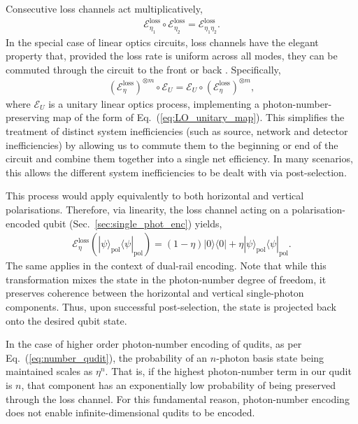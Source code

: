 \documentclass[aps, rmp, twocolumn, amsmath, amssymb, nofootinbib, superscriptaddress, longbibliography, floatfix, table-of-contents, eqsecnum]{revtex4-1}
\newcommand{\bra}[1]{\langle#1|}
\newcommand{\ket}[1]{|#1\rangle}
\begin{document}
Consecutive loss channels act multiplicatively,
\begin{align}
\mathcal{E}_{\eta_1}^\text{loss} \circ \mathcal{E}_{\eta_2}^\text{loss} = \mathcal{E}_{\eta_1 \eta_2}^\text{loss}.
\end{align}
In the special case of linear optics circuits, loss channels have the elegant property that, provided the loss rate is uniform across all modes, they can be commuted through the circuit to the front or back \cite{???}. Specifically,
\begin{align}
(\mathcal{E}_{\eta}^\text{loss})^{\otimes m} \circ \mathcal{E}_U = \mathcal{E}_U \circ (\mathcal{E}_{\eta}^\text{loss})^{\otimes m},
\end{align}
where $\mathcal{E}_U$ is a unitary linear optics process, implementing a photon-number-preserving map of the form of Eq.~(\ref{eq:LO_unitary_map}). This simplifies the treatment of distinct system inefficiencies (such as source, network and detector inefficiencies) by allowing us to commute them to the beginning or end of the circuit and combine them together into a single net efficiency. In many scenarios, this allows the different system inefficiencies to be dealt with via post-selection.

This process would apply equivalently to both horizontal and vertical polarisations. Therefore, via linearity, the loss channel acting on a polarisation-encoded qubit (Sec.~\ref{sec:single_phot_enc}) yields,
\begin{align}
\mathcal{E}^\text{loss}_\eta(\ket\psi_\text{pol}\bra\psi_\text{pol}) = (1-\eta) \ket{0}\bra{0} + \eta\ket\psi_\text{pol}\bra\psi_\text{pol}.
\end{align}
The same applies in the context of dual-rail encoding. Note that while this transformation mixes the state in the photon-number degree of freedom, it preserves coherence between the horizontal and vertical single-photon components. Thus, upon successful post-selection, the state is projected back onto the desired qubit state.

In the case of higher order photon-number encoding of qudits, as per Eq.~(\ref{eq:number_qudit}), the probability of an $n$-photon basis state being maintained scales as $\eta^n$. That is, if the highest photon-number term in our qudit is $n$, that component has an exponentially low probability of being preserved through the loss channel. For this fundamental reason, photon-number encoding does not enable infinite-dimensional qudits to be encoded.
\end{document}
